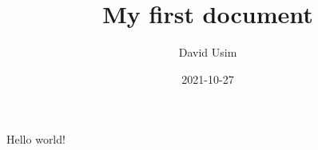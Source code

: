\documentclass{article}
\title{My first document}
\date{2021-10-27}
\author{David Usim}
\begin{document}
	\maketitle
	\newpage
	Hello world!
\end{document}
